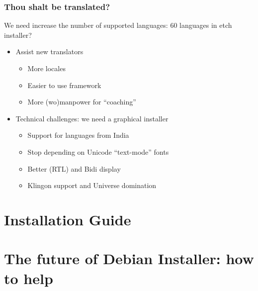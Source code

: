\documentclass{beamer}
\begin{document}
\begin{frame}
  \frametitle{Thou shalt be translated?}

We need increase the number of supported languages: 60 languages in
etch installer?

	\begin{itemize}
	\item
		Assist new translators
		\begin{itemize}
			\item
				More locales
			\item
				Easier to use framework
			\item
				More (wo)manpower for ``coaching''
		\end{itemize}
	\item
		Technical challenges: we need a graphical installer
		\begin{itemize}
			\item
				Support for languages from India
			\item
				Stop depending on Unicode ``text-mode'' fonts
			\item
				Better (RTL) and Bidi display
			\item
				Klingon support and Universe domination
		\end{itemize}
	\end{itemize}

\end{frame}


\section{Installation Guide}

\begin{frame}
  \frametitle{}
\end{frame}


\section{The future of Debian Installer: how to help}

\begin{frame}
  \frametitle{}
\end{frame}
\end{document}
